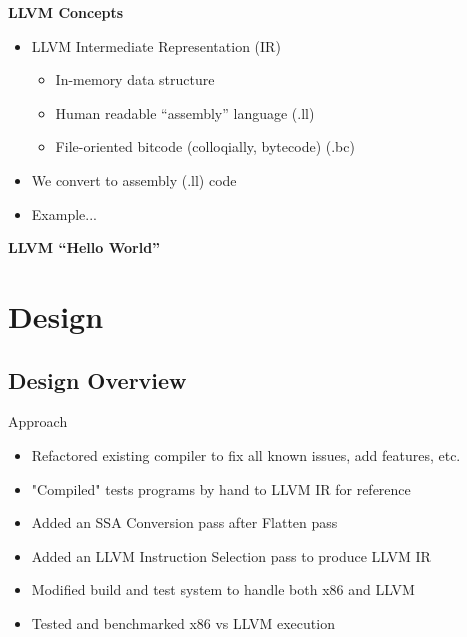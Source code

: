 \documentclass{beamer}
\begin{document}
\begin{frame}{\bf LLVM Concepts}
  \begin{itemize}
  \item<1->LLVM Intermediate Representation (IR)
    \begin{itemize}
    \item<1->In-memory data structure
    \item<1->Human readable ``assembly'' language (.ll)
    \item<1->File-oriented bitcode (colloqially, bytecode) (.bc)
    \end{itemize}
  \item<2->We convert to assembly (.ll) code
  \item<3->Example...
  \end{itemize}
\end{frame}

\begin{frame}{\bf LLVM ``Hello World''}
  
\end{frame}

\section{Design}

\subsection{Design Overview}

\begin{frame}{Approach}
  \begin{itemize}
  \item<1->Refactored existing compiler to fix all known issues, add
    features, etc.
  \item<2->"Compiled" tests programs by hand to LLVM IR for reference
  \item<3->Added an SSA Conversion pass after Flatten pass
  \item<4->Added an LLVM Instruction Selection pass to produce LLVM IR
  \item<5->Modified build and test system to handle both x86 and LLVM
  \item<6->Tested and benchmarked x86 vs LLVM execution
  \end{itemize}
\end{frame}
\end{document}
